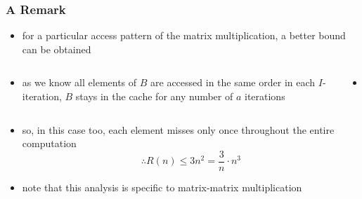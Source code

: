 \documentclass[12pt,dvipdfmx]{beamer}
\begin{document}
\begin{frame}[fragile]
\frametitle{A Remark}
\begin{itemize}
\item for a particular access pattern of the
  matrix multiplication,
  a better bound can be obtained
\end{itemize}
\begin{columns}
  \begin{column}{0.5\textwidth}
    \begin{itemize}
    \item as we know all elements of $B$ are accessed in the same order in
      each $I$-iteration,
      $B$ stays in the cache for any number of $a$ iterations
    \end{itemize}
\end{column}

\begin{column}{0.5\textwidth}
  \begin{itemize}
  \item []
{\tiny\def\svgwidth{0.9\textwidth}
}
\end{itemize}
\end{column}
\end{columns}

\begin{itemize}
\item so, in this case too, each element misses only once throughout the entire computation
  \[ \therefore R(n) \leq 3n^2 = \frac{3}{n} \cdot n^3 \]
\item note that this analysis is specific to matrix-matrix multiplication
\end{itemize}

\end{frame}
\end{document}
